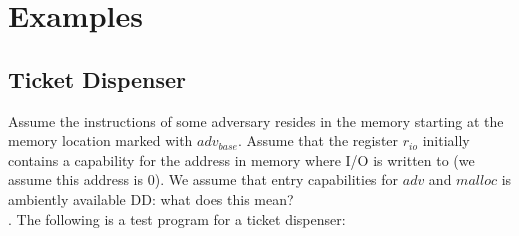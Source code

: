 \documentclass{article}
\newcommand\dominique[1]{{\color{purple} \sf \footnotesize {DD: #1}}\\}
\newcommand{\var}[1]{\mathit{#1}}
\newcommand{\hs}{\var{hs}}
\newcommand{\codelabel}[1]{\mathit{#1}}
\newcommand{\malloc}{\codelabel{malloc}}
\begin{document}
\section{Examples}
\label{sec:examples}
\subsection{Ticket Dispenser}
\label{sec:tick-disp}
\newcommand{\hsfoot}{\hs_\var{footprint}}
\newcommand{\hsframe}{\hs_\var{frame}}
\newcommand{\size}{\var{size}}
\newcommand{\rio}{r_{io}}
\newcommand{\adv}{\codelabel{adv}}
\newcommand{\advb}{\var{adv_{base}}}
\newcommand{\adve}{\var{adv_{end}}}
\newcommand{\initb}{\var{init}_{base}}
\newcommand{\inite}{\var{init}_{end}}
\newcommand{\mrlen}{5cm}
\newcommand{\retm}{\var{ret}_{\malloc}}
\newcommand{\reta}{\var{ret}_{\adv}}
\newcommand{\base}{\var{base}}
\newcommand{\eend}{\var{end}}
\newcommand{\bracket}[1]{\multirow{#1}{*}{\ensuremath{
 \left . \vphantom{\begin{array}{l}
 \ifthenelse{\equal{#1}{1}}{3\\}{
    \ifthenelse{\equal{#1}{2}}{3\\3\\}{
    \ifthenelse{\equal{#1}{3}}{3\\3\\3\\}{
    \ifthenelse{\equal{#1}{4}}{3\\3\\3\\3\\}{
    \ifthenelse{\equal{#1}{5}}{3\\3\\3\\3\\3\\}{
    \ifthenelse{\equal{#1}{6}}{3\\3\\3\\3\\3\\3\\}{
      3\\3\\3\\3\\3\\3\\3\\ %
  }}}}}}
  \end{array}} \right \}}}
}
\newcommand{\annotate}[2]{\multirow{#1}{\mrlen}{\scriptsize #2}}
Assume the instructions of some adversary resides in the memory starting at the memory location marked with $\advb$. Assume that the register $\rio$ initially contains a capability for the address in memory where I/O is written to (we assume this address is 0). We assume that entry capabilities for $\adv$ and $\malloc$ is ambiently available\dominique{what does this mean?}. The following is a test program for a ticket dispenser:
\end{document}

